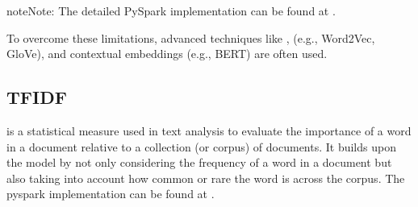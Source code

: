 \documentclass[letterpaper,11pt,english]{sphinxmanual}
\begin{document}
\begin{sphinxadmonition}{note}{Note:}
\sphinxAtStartPar
The detailed PySpark implementation can be found at .
\end{sphinxadmonition}

\sphinxAtStartPar
To overcome these limitations, advanced techniques like , 
(e.g., Word2Vec, GloVe), and contextual embeddings (e.g., BERT) are often used.


\subsection{TF\sphinxhyphen{}IDF}
\label{\detokenize{embedding:tf-idf}}
\sphinxAtStartPar
{} is a statistical measure used
in text analysis to evaluate the importance of a word in a document relative to a
collection (or corpus) of documents. It builds upon the  model
by not only considering the frequency of a word in a document but also taking
into account how common or rare the word is across the corpus. The pyspark implementation
can be found at .
\end{document}
